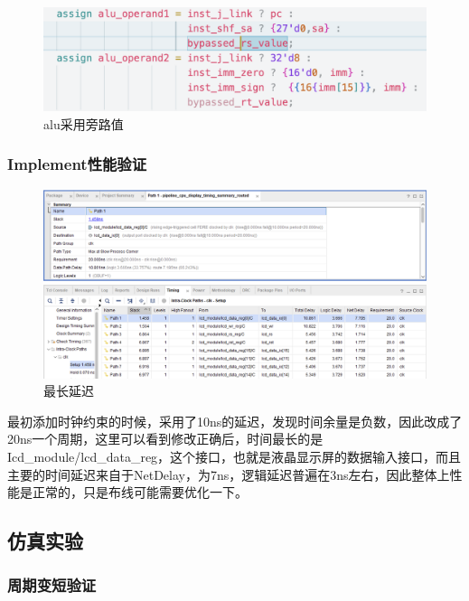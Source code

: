 \documentclass[a4paper]{article}
\begin{document}
\begin{figure}[H]
    \centering
    \includegraphics[width=0.8\linewidth]{img/旁路修改图片/alu用旁路的值.png}
    \caption{alu采用旁路值}
\end{figure}

\subsubsection{Implement性能验证}

\begin{figure}[H]
    \centering
    \includegraphics[width=\linewidth]{img/上箱/最长延迟.jpg}
    \caption{最长延迟}
\end{figure}

最初添加时钟约束的时候，采用了10ns的延迟，发现时间余量是负数，因此改成了20ns一个周期，这里可以看到修改正确后，时间最长的是Icd\_module/lcd\_data\_reg，这个接口，也就是液晶显示屏的数据输入接口，而且主要的时间延迟来自于NetDelay，为7ns，逻辑延迟普遍在3ns左右，因此整体上性能是正常的，只是布线可能需要优化一下。







\newpage

\subsection{仿真实验}

\subsubsection{周期变短验证}
\end{document}
